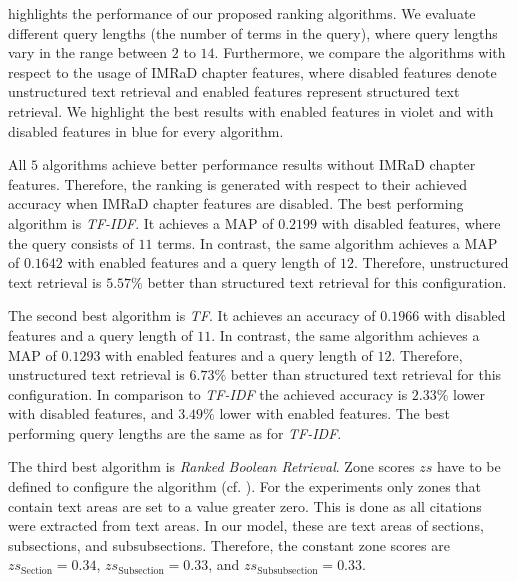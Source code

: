  highlights the performance of our proposed ranking algorithms. We evaluate different query lengths (the number of terms in the query), where query lengths vary in the range between $2$ to $14$. Furthermore, we compare the algorithms with respect to the usage of IMRaD chapter features, where disabled features denote unstructured text retrieval and enabled features represent structured text retrieval. We highlight the best results with enabled features in violet and with disabled features in blue for every algorithm.

All $5$ algorithms achieve better performance results without IMRaD chapter features. Therefore, the ranking is generated with respect to their achieved accuracy when IMRaD chapter features are disabled. The best performing algorithm is \textit{TF-IDF}. It achieves a MAP of $0.2199$ with disabled features, where the query consists of $11$ terms. In contrast, the same algorithm achieves a MAP of $0.1642$ with enabled features and a query length of $12$. Therefore, unstructured text retrieval is $5.57 \%$ better than structured text retrieval for this configuration.

The second best algorithm is \textit{TF}. It achieves an accuracy of $0.1966$ with disabled features and a query length of $11$. In contrast, the same algorithm achieves a MAP of $0.1293$ with enabled features and a query length of $12$. Therefore, unstructured text retrieval is $6.73 \%$ better than structured text retrieval for this configuration. In comparison to \textit{TF-IDF} the achieved accuracy is $2.33 \%$ lower with disabled features, and $3.49 \%$ lower with enabled features. The best performing query lengths are the same as for \textit{TF-IDF}.

The third best algorithm is \textit{Ranked Boolean Retrieval}. Zone scores $zs$ have to be defined to configure the algorithm (cf. ). For the experiments only zones that contain text areas are set to a value greater zero. This is done as all citations were extracted from text areas. In our model, these are text areas of sections, subsections, and subsubsections. Therefore, the constant zone scores are $zs_{\text{Section}} = 0.34$, $zs_{\text{Subsection}} = 0.33$, and $zs_{\text{Subsubsection}} = 0.33$.

